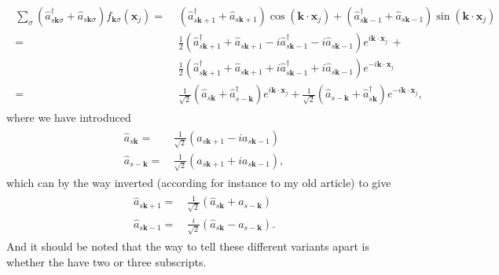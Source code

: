 \documentclass{report}
\begin{document}
\begin{align}
\begin{aligned}
	\sum_{\sigma}
	(\hat a_{s\boldsymbol{k}\sigma}^\dagger + \hat a_{s\boldsymbol{k}\sigma})
	f_{\boldsymbol{k}\sigma}(\boldsymbol{x}_j)
	=&\,\,
	(\hat a_{s\boldsymbol{k}+1}^\dagger + \hat a_{s\boldsymbol{k}+1})
		\cos(\boldsymbol{k}\cdot\boldsymbol{x}_j) +
	(\hat a_{s\boldsymbol{k}-1}^\dagger + \hat a_{s\boldsymbol{k}-1}) 
		\sin(\boldsymbol{k}\cdot\boldsymbol{x}_j)
	\\=&\,\,
	\frac{1}{2}
	(\hat a_{s\boldsymbol{k}+1}^\dagger + \hat a_{s\boldsymbol{k}+1} - 
	i\hat a_{s\boldsymbol{k}-1}^\dagger - i\hat a_{s\boldsymbol{k}-1})
		e^{i\boldsymbol{k}\cdot\boldsymbol{x}_j} \,+
	\\\phantom{=}&\,\,
	\frac{1}{2}
	(\hat a_{s\boldsymbol{k}+1}^\dagger + \hat a_{s\boldsymbol{k}+1} + 
	i\hat a_{s\boldsymbol{k}-1}^\dagger + i\hat a_{s\boldsymbol{k}-1})
		e^{-i\boldsymbol{k}\cdot\boldsymbol{x}_j}
	\\=&\,\,
	\frac{1}{\sqrt{2}}
	(\hat a_{s\boldsymbol{k}} + \hat a_{s-\boldsymbol{k}}^\dagger)
		e^{i\boldsymbol{k}\cdot\boldsymbol{x}_j} +
	\frac{1}{\sqrt{2}}
	(\hat a_{s-\boldsymbol{k}} + \hat a_{s\boldsymbol{k}}^\dagger)
		e^{-i\boldsymbol{k}\cdot\boldsymbol{x}_j},
\end{aligned}
\end{align}
where we have introduced
\begin{align}
\begin{aligned}
	\hat a_{s\boldsymbol{k}} =&\, 
		\frac{1}{\sqrt{2}} (\hat a_{s\boldsymbol{k}+1} - i a_{s\boldsymbol{k}-1})
	\\
	\hat a_{s-\boldsymbol{k}} =&\, 
		\frac{1}{\sqrt{2}} (\hat a_{s\boldsymbol{k}+1} + i a_{s\boldsymbol{k}-1}),
\end{aligned}
\end{align}
which can by the way inverted (according for instance to my old article) to give
\begin{align}
\begin{aligned}
	\hat a_{s\boldsymbol{k}+1} =&\, 
		\frac{1}{\sqrt{2}} (\hat a_{s\boldsymbol{k}} + a_{s-\boldsymbol{k}})
	\\
	\hat a_{s\boldsymbol{k}-1} =&\, 
		\frac{i}{\sqrt{2}} (\hat a_{s\boldsymbol{k}} - a_{s-\boldsymbol{k}}).
\end{aligned}
\end{align}
And it should be noted that the way to tell these different variants apart is whether the have two or three subscripts. %
\end{document}
